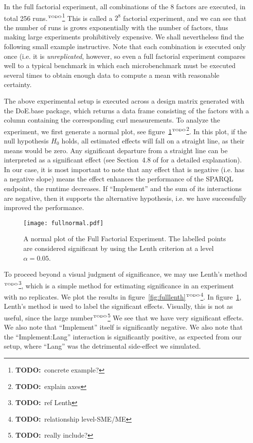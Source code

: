 \documentclass{article}
\newcommand{\todo}[1]{\ensuremath{^{\textrm{\tiny{TODO}\normalsize}}}\footnote{\textbf{TODO:}~#1}}
\begin{document}
In the full factorial experiment, all combinations of the 8 factors
are executed, in total 256 runs.\todo{concrete example?} This is
called a $2^8$ factorial experiment, and we can see that the number of
runs is grows exponentially with the number of factors, thus making
large experiments prohibitively expensive. We shall nevertheless find
the following small example instructive. Note that each combination is
executed only once (i.e. it is \emph{unreplicated}, however, so even a
full factorial experiment compares well to a typical benchmark in
which each microbenchmark must be executed several times to obtain
enough data to compute a mean with reasonable certainty.

The above experimental setup is executed across a design matrix
generated with the DoE.base package, which returns a data frame
consisting of the factors with a column containing the corresponding
curl measurements. To analyze the experiment, we first generate a
normal plot, see figure~\ref{fig:fullnormal}\todo{explain axes}. In this plot, if the
null hypothesis $H_0$ holds, all estimated effects will fall on a
straight line, as their means would be zero. Any significant departure
from a straight line can be interpreted as a significant effect (see
Section~4.8 of \cite{wu2009experiments} for a detailed
explanation). In our case, it is most important to note that any
effect that is negative (i.e. has a negative slope) means the effect
enhances the performance of the SPARQL endpoint, the runtime
decreases. If ``Implement'' and the sum of its interactions are
negative, then it supports the alternative hypothesis, i.e. we have
successfully improved the performance.

\begin{figure}[h]
  \texttt{[image: fullnormal.pdf]}
  \caption{A normal plot of the Full Factorial Experiment. The
    labelled points are considered significant by using the Lenth
    criterion at a level $\alpha=0.05$.}\label{fig:fullnormal}
\end{figure}


To proceed beyond a visual judgment of significance, we may use
Lenth's method\todo{ref Lenth}, which is a simple method for
estimating significance in an experiment with no replicates. We plot
the results in figure~\ref{fig:fulllenth}\todo{relationship level-SME/ME}. In
figure~\ref{fig:fullnormal}, Lenth's method is used to label the
significant effects. Visually, this is not as useful, since the large
number\todo{really include?} We see that we have very significant
effects. We also note that ``Implement'' itself is significantly
negative. We also note that the ``Implement:Lang'' interaction is
significantly positive, as expected from our setup, where ``Lang'' was
the detrimental side-effect we simulated.
\end{document}
